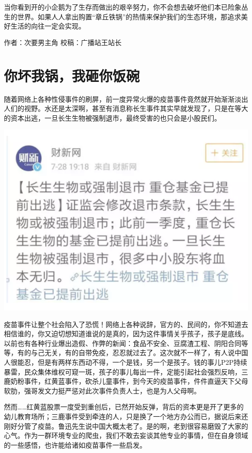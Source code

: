 \documentclass[]{book}
\begin{document}
当你看到开的小企鹅为了生存而做出的艰辛努力，你不会想去破坏他们本已险象丛生的世界。如果人人拿出购置``章丘铁锅''的热情来保护我们的生态环境，那追求美好生活的向往一定会实现。

作者：次要男主角
校稿：广播站王站长

\hypertarget{ux4f60ux574fux6211ux9505ux6211ux7838ux4f60ux996dux7897}{%
\section{你坏我锅，我砸你饭碗}\label{ux4f60ux574fux6211ux9505ux6211ux7838ux4f60ux996dux7897}}

随着网络上各种性侵事件的刷屏，前一度异常火爆的疫苗事件竟然就开始渐渐淡出人们的视野。水还是太深啊，甚至有消息称长生事件其实早就发现了，只是在等大的资本出逃，一旦长生生物被强制退市，最终受害的也只会是小股民们。

\includegraphics[width=6.67in]{images/fw1}

疫苗事件让整个社会陷入了恐慌！网络上各种说辞，官方的、民间的，你不知道去相信谁的，你又迫切想知道谁说的是真的，因为这件事情关乎孩子，孩子是底线。以前也有各种行业爆出造假、作弊的新闻：食品不安全、豆腐渣工程、阴阳合同等等，有的与己无关，有的自带免疫，忍忍就过去了。这次就不一样了，有人说中国人很能忍，但是有两样东西动不得，一个是钱，另一个是孩子。钱的事儿P2P持续暴雷，民众集体维权可窥一斑，孩子的事儿每出一件，定能引起社会强烈反响，三鹿奶粉事件，红黄蓝事件，砍杀儿童事件，到今天的疫苗事件，件件直逼天下父母软肋，强哥发文力挺严惩对此次事件负责人士，也是为人父母啊。

然而\ldots{}\ldots{}红黄蓝股票一度受到重创后，已然开始反弹，背后的资本更是开了更多的幼儿教育场所；三鹿事件受到牵连的人，只是换了一个地方办公而已，据说后来还刚好分管了疫苗。鲁迅先生说中国大概太老了。是的啊，老到很容易磨毁了大家的心气。作为一群环境专业的爬虫，我们不敢去妄谈其他专业的事情，但在自身领域的一些感悟，也许能给诸如疫苗事件一些启发。
\end{document}
